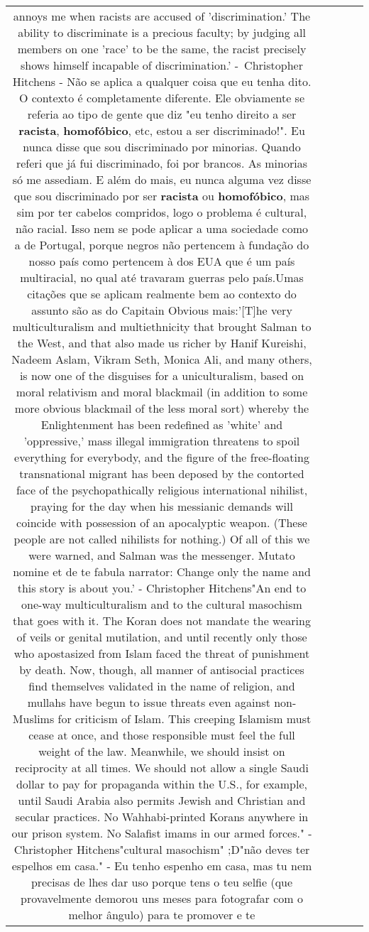 \documentclass[11pt]{article}
\newlength\mylength
\begin{document}
\begin{center}
\begin{longtable}{|C{.65\mylength}|C{.30\mylength}|C{.12\mylength}|C{.12\mylength}|C{.12\mylength}|}
annoys me when racists are accused of 'discrimination.' The ability to discriminate is a precious faculty; by judging all members on one 'race' to be the same, the racist precisely shows himself incapable of discrimination.' - Christopher Hitchens - Não se aplica a qualquer coisa que eu tenha dito. O contexto é completamente diferente. Ele obviamente se referia ao tipo de gente que diz "eu tenho direito a ser \textbf{racista}, \textbf{homofóbico}, etc, estou a ser discriminado!". Eu nunca disse que sou discriminado por minorias. Quando referi que já fui discriminado, foi por brancos. As minorias só me assediam. E além do mais, eu nunca alguma vez disse que sou discriminado por ser \textbf{racista} ou \textbf{homofóbico}, mas sim por ter cabelos compridos, logo o problema é cultural, não racial. Isso nem se pode aplicar a uma sociedade como a de Portugal, porque negros não pertencem à fundação do nosso país como pertencem à dos EUA que é um país multiracial, no qual até travaram guerras pelo país.Umas citações que se aplicam realmente bem ao contexto do assunto são as do Capitain Obvious mais:'[T]he very multiculturalism and multiethnicity that brought Salman to the West, and that also made us richer by Hanif Kureishi, Nadeem Aslam, Vikram Seth, Monica Ali, and many others, is now one of the disguises for a uniculturalism, based on moral relativism and moral blackmail (in addition to some more obvious blackmail of the less moral sort) whereby the Enlightenment has been redefined as 'white' and 'oppressive,' mass illegal immigration threatens to spoil everything for everybody, and the figure of the free-floating transnational migrant has been deposed by the contorted face of the psychopathically religious international nihilist, praying for the day when his messianic demands will coincide with possession of an apocalyptic weapon. (These people are not called nihilists for nothing.) Of all of this we were warned, and Salman was the messenger. Mutato nomine et de te fabula narrator: Change only the name and this story is about you.' - Christopher Hitchens"An end to one-way multiculturalism and to the cultural masochism that goes with it. The Koran does not mandate the wearing of veils or genital mutilation, and until recently only those who apostasized from Islam faced the threat of punishment by death. Now, though, all manner of antisocial practices find themselves validated in the name of religion, and mullahs have begun to issue threats even against non-Muslims for criticism of Islam. This creeping Islamism must cease at once, and those responsible must feel the full weight of the law. Meanwhile, we should insist on reciprocity at all times. We should not allow a single Saudi dollar to pay for propaganda within the U.S., for example, until Saudi Arabia also permits Jewish and Christian and secular practices. No Wahhabi-printed Korans anywhere in our prison system. No Salafist imams in our armed forces." - Christopher Hitchens"cultural masochism" ;D"não deves ter espelhos em casa." - Eu tenho espenho em casa, mas tu nem precisas de lhes dar uso porque tens o teu selfie (que provavelmente demorou uns meses para fotografar com o melhor ângulo) para te promover e te 
\end{longtable}
\end{center}
\end{document}
